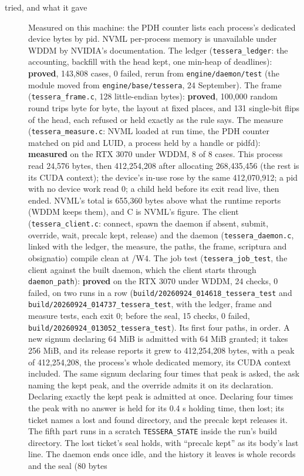 \begin{description}
\item[{tried, and what it gave}] Measured on this machine: the PDH counter lists each process's dedicated device bytes by pid. NVML per-process memory is unavailable under WDDM by NVIDIA's documentation. The ledger (\texttt{tessera\_\allowbreak{}ledger}: the accounting, backfill with the head kept, one min-heap of deadlines): \textbf{proved}, 143,808 cases, 0 failed, rerun from \texttt{engine/\allowbreak{}daemon/\allowbreak{}test} (the module moved from \texttt{engine/\allowbreak{}base/\allowbreak{}tessera}, 24 September). The frame (\texttt{tessera\_\allowbreak{}frame.\allowbreak{}c}, 128 little-endian bytes): \textbf{proved}, 100,000 random round trips byte for byte, the layout at fixed places, and 131 single-bit flips of the head, each refused or held exactly as the rule says. The measure (\texttt{tessera\_\allowbreak{}measure.\allowbreak{}c}: NVML loaded at run time, the PDH counter matched on pid and LUID, a process held by a handle or pidfd): \textbf{measured} on the RTX 3070 under WDDM, 8 of 8 cases. This process read 24,576 bytes, then 412,254,208 after allocating 268,435,456 (the rest is its CUDA context); the device's in-use rose by the same 412,070,912; a pid with no device work read 0; a child held before its exit read live, then ended. NVML's total is 655,360 bytes above what the runtime reports (WDDM keeps them), and C is NVML's figure. The client (\texttt{tessera\_\allowbreak{}client.\allowbreak{}c}: connect, spawn the daemon if absent, submit, override, wait, precalc kept, release) and the daemon (\texttt{tessera\_\allowbreak{}daemon.\allowbreak{}c}, linked with the ledger, the measure, the paths, the frame, scriptura and obsignatio) compile clean at /W4. The job test (\texttt{tessera\_\allowbreak{}job\_\allowbreak{}test}, the client against the built daemon, which the client starts through \texttt{daemon\_\allowbreak{}path}): \textbf{proved} on the RTX 3070 under WDDM, 24 checks, 0 failed, on two runs in a row (\texttt{build/\allowbreak{}20260924\_\allowbreak{}014618\_\allowbreak{}tessera\_\allowbreak{}test} and \texttt{build/\allowbreak{}20260924\_\allowbreak{}014737\_\allowbreak{}tessera\_\allowbreak{}test}, with the ledger, frame and measure tests, each exit 0; before the seal, 15 checks, 0 failed, \texttt{build/\allowbreak{}20260924\_\allowbreak{}013052\_\allowbreak{}tessera\_\allowbreak{}test}). Its first four paths, in order. A new signum declaring 64 MiB is admitted with 64 MiB granted; it takes 256 MiB, and its release reports it grew to 412,254,208 bytes, with a peak of 412,254,208, the process's whole dedicated memory, its CUDA context included. The same signum declaring four times that peak is asked, the ask naming the kept peak, and the override admits it on its declaration. Declaring exactly the kept peak is admitted at once. Declaring four times the peak with no answer is held for its 0.4 s holding time, then lost; its ticket names a lost and found directory, and the precalc kept releases it. The fifth part runs in a scratch \texttt{TESSERA\_\allowbreak{}STATE} inside the run's build directory. The lost ticket's seal holds, with “precalc kept” as its body's last line. The daemon ends once idle, and the history it leaves is whole records and the seal (80 bytes 
\end{description}
